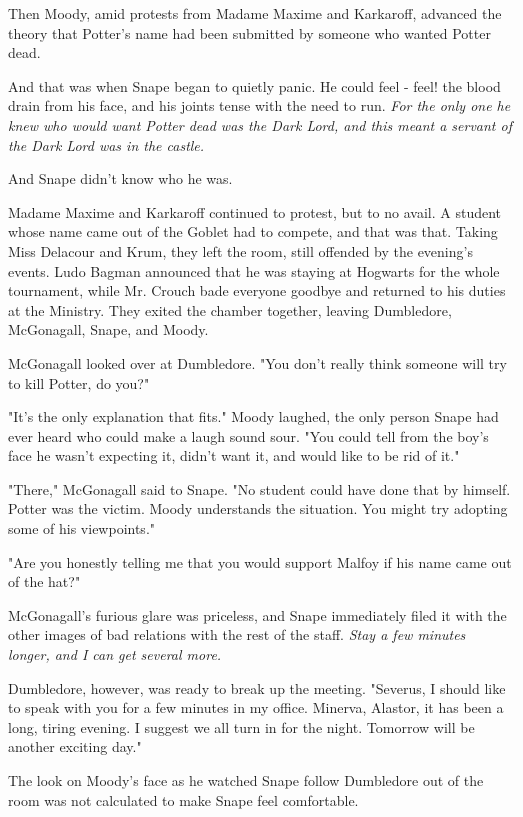 Then Moody, amid protests from Madame Maxime and Karkaroff, advanced the theory that Potter's name had been submitted by someone who wanted Potter dead.

And that was when Snape began to quietly panic. He could feel - feel! the blood drain from his face, and his joints tense with the need to run. \emph{For the only one he knew who would want Potter dead was the Dark Lord, and this meant a servant of the Dark Lord was in the castle.}

And Snape didn't know who he was.

Madame Maxime and Karkaroff continued to protest, but to no avail. A student whose name came out of the Goblet had to compete, and that was that. Taking Miss Delacour and Krum, they left the room, still offended by the evening's events. Ludo Bagman announced that he was staying at Hogwarts for the whole tournament, while Mr. Crouch bade everyone goodbye and returned to his duties at the Ministry. They exited the chamber together, leaving Dumbledore, McGonagall, Snape, and Moody.

McGonagall looked over at Dumbledore. "You don't really think someone will try to kill Potter, do you?"

"It's the only explanation that fits." Moody laughed, the only person Snape had ever heard who could make a laugh sound sour. "You could tell from the boy's face he wasn't expecting it, didn't want it, and would like to be rid of it."

"There," McGonagall said to Snape. "No student could have done that by himself. Potter was the victim. Moody understands the situation. You might try adopting some of his viewpoints."

"Are you honestly telling me that you would support Malfoy if his name came out of the hat?"

McGonagall's furious glare was priceless, and Snape immediately filed it with the other images of bad relations with the rest of the staff. \emph{Stay a few minutes longer, and I can get several more.}

Dumbledore, however, was ready to break up the meeting. "Severus, I should like to speak with you for a few minutes in my office. Minerva, Alastor, it has been a long, tiring evening. I suggest we all turn in for the night. Tomorrow will be another exciting day."

The look on Moody's face as he watched Snape follow Dumbledore out of the room was not calculated to make Snape feel comfortable.

